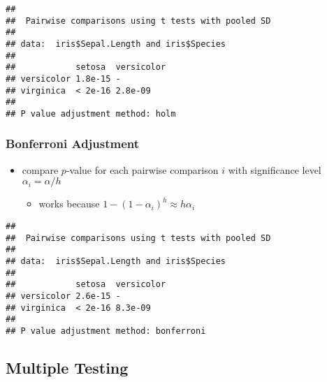 \documentclass[
]{book}
\newenvironment{Shaded}{\begin{snugshade}}{\end{snugshade}}
\newcommand{\DataTypeTok}[1]{\textcolor[rgb]{0.13,0.29,0.53}{#1}}
\newcommand{\KeywordTok}[1]{\textcolor[rgb]{0.13,0.29,0.53}{\textbf{#1}}}
\newcommand{\NormalTok}[1]{#1}
\newcommand{\OperatorTok}[1]{\textcolor[rgb]{0.81,0.36,0.00}{\textbf{#1}}}
\newcommand{\StringTok}[1]{\textcolor[rgb]{0.31,0.60,0.02}{#1}}
\providecommand{\tightlist}{%
  \setlength{\itemsep}{0pt}\setlength{\parskip}{0pt}}
\begin{document}
\begin{Shaded}
\end{Shaded}

\begin{verbatim}
## 
##  Pairwise comparisons using t tests with pooled SD 
## 
## data:  iris$Sepal.Length and iris$Species 
## 
##            setosa  versicolor
## versicolor 1.8e-15 -         
## virginica  < 2e-16 2.8e-09   
## 
## P value adjustment method: holm
\end{verbatim}

\hypertarget{bonferroni-adjustment}{%
\subsubsection{Bonferroni Adjustment}\label{bonferroni-adjustment}}

\begin{itemize}
\tightlist
\item
  compare \(p\)-value for each pairwise comparison \(i\) with significance level
  \(\alpha_i = \alpha / h\)

  \begin{itemize}
  \tightlist
  \item
    works because \(1 - (1 - \alpha_i)^h \approx h \alpha_i\)
  \end{itemize}
\end{itemize}

\begin{Shaded}
\end{Shaded}

\begin{verbatim}
## 
##  Pairwise comparisons using t tests with pooled SD 
## 
## data:  iris$Sepal.Length and iris$Species 
## 
##            setosa  versicolor
## versicolor 2.6e-15 -         
## virginica  < 2e-16 8.3e-09   
## 
## P value adjustment method: bonferroni
\end{verbatim}

\hypertarget{multiple-testing}{%
\subsection{Multiple Testing}\label{multiple-testing}}
\end{document}
